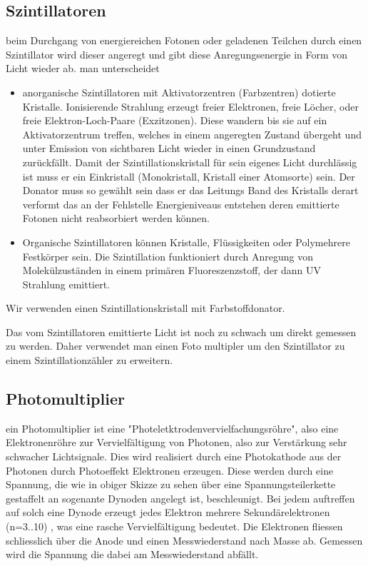 \documentclass[12pt]{article}
\begin{document}
\subsection{Szintillatoren}
beim Durchgang von energiereichen Fotonen oder geladenen Teilchen durch einen Szintillator wird dieser angeregt und gibt diese Anregungsenergie in Form von Licht wieder ab.
man unterscheidet
\begin{itemize}
 \item anorganische Szintillatoren
  mit Aktivatorzentren (Farbzentren) dotierte Kristalle. Ionisierende Strahlung erzeugt freier Elektronen, freie Löcher, oder freie Elektron-Loch-Paare (Exzitzonen).
  Diese wandern bis sie auf ein Aktivatorzentrum treffen, welches in einem angeregten Zustand übergeht und unter Emission von sichtbaren Licht wieder in einen Grundzustand 						zurückfällt. Damit der Szintillationskristall für sein eigenes Licht durchlässig ist muss er ein Einkristall (Monokristall, Kristall einer Atomsorte) sein. Der Donator muss so gewählt sein
  dass er das Leitungs Band des Kristalls derart verformt das an der Fehlstelle Energieniveaus entstehen deren emittierte Fotonen nicht reabsorbiert werden können.
 \item Organische Szintillatoren
  können Kristalle, Flüssigkeiten oder Polymehrere Festkörper sein. Die Szintillation funktioniert durch Anregung von Molekülzuständen in einem primären Fluoreszenzstoff, der 
  dann UV Strahlung emittiert.
\end{itemize}
Wir verwenden einen Szintillationskristall mit Farbstoffdonator.\newline

Das vom Szintillatoren emittierte Licht ist noch zu schwach um direkt gemessen zu werden. Daher verwendet man einen Foto multipler um den Szintillator zu einem Szintillationzähler zu erweitern.

\subsection{Photomultiplier}

ein Photomultiplier ist eine "Photeletktrodenvervielfachungsröhre", also eine Elektronenröhre zur Vervielfältigung von Photonen, also zur Verstärkung sehr schwacher Lichtsignale. Dies wird realisiert durch 
eine Photokathode aus der Photonen durch Photoeffekt Elektronen erzeugen. Diese werden durch eine Spannung, die wie in obiger Skizze zu sehen über eine Spannungsteilerkette gestaffelt an sogenante Dynoden angelegt ist, beschleunigt. 
Bei jedem auftreffen auf solch eine Dynode erzeugt jedes Elektron mehrere Sekundärelektronen (n=3..10) , was eine rasche Vervielfältigung bedeutet. Die Elektronen fliessen schliesslich über die Anode und einen Messwiederstand nach Masse ab. Gemessen wird die Spannung die dabei am Messwiederstand abfällt. \newline
\end{document}
